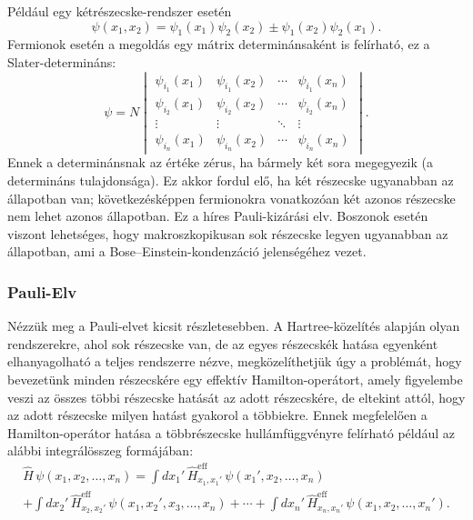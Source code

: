 \documentclass[../main.tex]{subfiles}
\begin{document}
Például egy kétrészecske-rendszer esetén
\[
\psi(x_1,x_2)=\psi_1(x_1)\psi_2(x_2)\pm\psi_1(x_2)\psi_2(x_1).
\]
Fermionok esetén a megoldás egy mátrix determinánsaként is felírható, ez a Slater-determináns:
\[
\psi = N
\begin{vmatrix}
\psi_{i_1}(x_1) & \psi_{i_1}(x_2) & \cdots & \psi_{i_1}(x_n) \\
\psi_{i_2}(x_1) & \psi_{i_2}(x_2) & \cdots & \psi_{i_2}(x_n) \\
\vdots & \vdots & \ddots & \vdots \\
\psi_{i_n}(x_1) & \psi_{i_n}(x_2) & \cdots & \psi_{i_n}(x_n)
\end{vmatrix}.
\]
Ennek a determinánsnak az értéke zérus, ha bármely két sora megegyezik (a determináns tulajdonsága). Ez akkor fordul elő, ha két részecske ugyanabban az állapotban van; következésképpen fermionokra vonatkozóan két azonos részecske nem lehet azonos állapotban. Ez a híres Pauli-kizárási elv. Boszonok esetén viszont lehetséges, hogy makroszkopikusan sok részecske legyen ugyanabban az állapotban, ami a Bose–Einstein-kondenzáció jelenségéhez vezet.

\subsubsection*{Pauli-Elv}
Nézzük meg a Pauli-elvet kicsit részletesebben. A Hartree-közelítés alapján olyan rendszerekre, ahol sok részecske van, de az egyes részecskék hatása egyenként elhanyagolható a teljes rendszerre nézve, megközelíthetjük úgy a problémát, hogy bevezetünk minden részecskére egy effektív Hamilton-operátort, amely figyelembe veszi az összes többi részecske hatását az adott részecskére, de eltekint attól, hogy az adott részecske milyen hatást gyakorol a többiekre. Ennek megfelelően a Hamilton-operátor hatása a többrészecske hullámfüggvényre felírható például az alábbi integrálösszeg formájában:
\begin{multline*}
\hat{H}\,\psi(x_1,x_2,\dots,x_n)
= \int dx_1'\,\hat{H}^{\mathrm{eff}}_{x_1,x_1'}\,\psi(x_1',x_2,\dots,x_n) \\
+ \int dx_2'\,\hat{H}^{\mathrm{eff}}_{x_2,x_2'}\,\psi(x_1,x_2',x_3,\dots,x_n)
+ \cdots
+ \int dx_n'\,\hat{H}^{\mathrm{eff}}_{x_n,x_n'}\,\psi(x_1,x_2,\dots,x_n').
\end{multline*}
\end{document}
